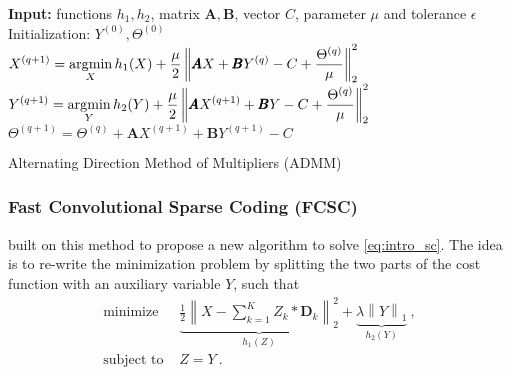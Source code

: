 \documentclass[../thesis.tex]{subfiles}
\begin{document}
\begin{algorithm}[tp]
\begin{algorithmic}[1]

	\STATE \textbf{Input: } functions $h_1, h_2$, matrix $\pmb A, \pmb B$, vector $C$, parameter $\mu$
						 and tolerance $\epsilon$
	\STATE Initialization: $Y^{(0)}, \Theta^{(0)}$
	\REPEAT
	\STATE $\displaystyle X^{(q+1)} = \operatorname*{\arg\!\min}_{X} h_1(X) + \frac{\mu}{2}
				\left\|\pmb AX + \pmb BY^{(q)} - C + \frac{\Theta^{(q)}}{\mu}\right\|_2^2$
	\label{alg:l_minx}
	\STATE $\displaystyle Y^{(q+1)} = \operatorname*{\arg\!\min}_{Y} h_2(Y) + \frac{\mu}{2}
				\left\|\pmb AX^{(q+1)} + \pmb BY - C + \frac{\Theta^{(q)}}{\mu}\right\|_2^2$
	\label{alg:l_miny}
	\STATE $\displaystyle \Theta^{(q+1)} = \Theta^{(q)} + \pmb AX^{(q+1)} + \pmb BY^{(q+1)} - C$
	\label{alg:l_maxa}

\end{algorithmic}
\caption{Alternating Direction Method of Multipliers (ADMM)}
\label{alg:admm}
\end{algorithm}



\subsubsection{Fast Convolutional Sparse Coding (FCSC)}
\label{ssub:fcsc}


\citet{Bristow2013} built on this method to propose a new algorithm to solve \autoref{eq:intro_sc}. The idea is to re-write the minimization problem by splitting the two parts of the cost function with an auxiliary variable $Y$, such that
%
\begin{equation}
	\label{eq:admm_sc}
	\begin{split}
		\text{minimize~} &
		\underbrace{\frac{1}{2} \left\|X - \sum_{k=1}^KZ_k* {\pmb D}_k\right\|_2^2}_{h_1(Z)}
		+ \underbrace{\lambda\left\|Y\right\|_1}_{h_2(Y)}~,\\
		\text{subject to~} & Z = Y~.
	\end{split}
\end{equation}
\end{document}
